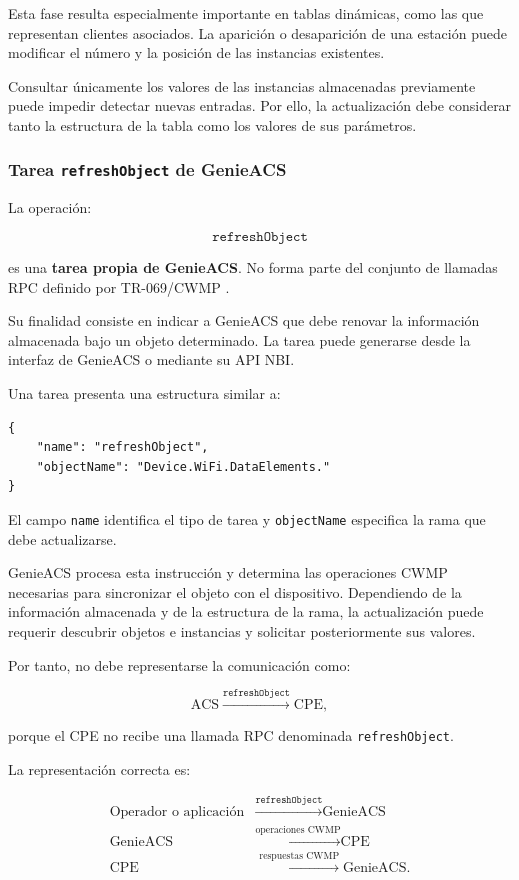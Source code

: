 Esta fase resulta especialmente importante en tablas dinámicas, como las
que representan clientes asociados. La aparición o desaparición de una
estación puede modificar el número y la posición de las instancias
existentes.

Consultar únicamente los valores de las instancias almacenadas
previamente puede impedir detectar nuevas entradas. Por ello, la
actualización debe considerar tanto la estructura de la tabla como los
valores de sus parámetros.


\subsubsection*{Tarea \texttt{refreshObject} de GenieACS}

La operación:

\[
    \texttt{refreshObject}
\]

es una \textbf{tarea propia de GenieACS}. No forma parte del conjunto de
llamadas RPC definido por TR-069/CWMP
\cite{genieacs_api}.

Su finalidad consiste en indicar a GenieACS que debe renovar la
información almacenada bajo un objeto determinado. La tarea puede
generarse desde la interfaz de GenieACS o mediante su API NBI.

Una tarea presenta una estructura similar a:

\begin{verbatim}
{
    "name": "refreshObject",
    "objectName": "Device.WiFi.DataElements."
}
\end{verbatim}

El campo \texttt{name} identifica el tipo de tarea y
\texttt{objectName} especifica la rama que debe actualizarse.

GenieACS procesa esta instrucción y determina las operaciones CWMP
necesarias para sincronizar el objeto con el dispositivo. Dependiendo de
la información almacenada y de la estructura de la rama, la actualización
puede requerir descubrir objetos e instancias y solicitar posteriormente
sus valores.

Por tanto, no debe representarse la comunicación como:

\[
    \text{ACS}
    \xrightarrow{\texttt{refreshObject}}
    \text{CPE},
\]

porque el CPE no recibe una llamada RPC denominada
\texttt{refreshObject}.

La representación correcta es:

\[
\begin{aligned}
    \text{Operador o aplicación}
    &\xrightarrow{\texttt{refreshObject}}
    \text{GenieACS}\\
    \text{GenieACS}
    &\xrightarrow{\text{operaciones CWMP}}
    \text{CPE}\\
    \text{CPE}
    &\xrightarrow{\text{respuestas CWMP}}
    \text{GenieACS}.
\end{aligned}
\]

